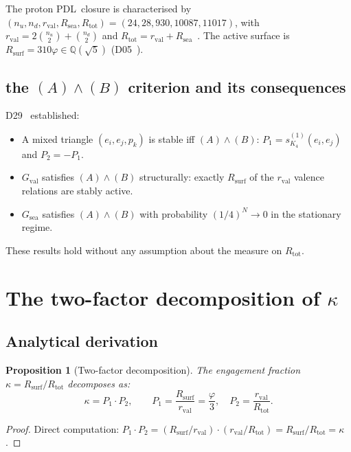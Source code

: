 \documentclass[11pt,a4paper]{article}
\newtheorem{proposition}[theorem]{Proposition}
\theoremstyle{definition}
\newcommand{\PDL}{\textnormal{PDL}}
\newcommand{\rval}{r_{\mathrm{val}}}
\newcommand{\Rsea}{R_{\mathrm{sea}}}
\newcommand{\Rtot}{R_{\mathrm{tot}}}
\newcommand{\Rsurf}{R_{\mathrm{surf}}}
\newcommand{\Gval}{G_{\mathrm{val}}}
\newcommand{\Gsea}{G_{\mathrm{sea}}}
\newcommand{\vp}{\varphi}
\newcommand{\kap}{\kappa}
\begin{document}
The proton \PDL\ closure is characterised by
$(n_u, n_d, \rval, \Rsea, \Rtot) = (24, 28, 930, 10087, 11017)$,
with $\rval = 2\binom{n_u}{2} + \binom{n_d}{2}$ and
$\Rtot = \rval + \Rsea$~\cite{PDL_Main_2026,Combinatorial_Proton_PDL_2026}.
The active surface is $\Rsurf = 310\vp \in \mathbb{Q}(\sqrt{5})$
(D05~\cite{PDL_Main_2026}).

\subsection{the \texorpdfstring{$(A)\wedge(B)$}{(A) wedge (B)} criterion and its consequences}

D29~\cite{PDL_D29_2026} established:
\begin{itemize}
\item A mixed triangle $(e_i, e_j, p_k)$ is stable iff
  $(A)\wedge(B)$: $P_1 = s_{K_4}^{(1)}(e_i,e_j)$ and
  $P_2 = -P_1$.
\item $\Gval$ satisfies $(A)\wedge(B)$ structurally: exactly
  $\Rsurf$ of the $\rval$ valence relations are stably active.
\item $\Gsea$ satisfies $(A)\wedge(B)$ with probability $(1/4)^N \to 0$
  in the stationary regime.
\end{itemize}

These results hold without any assumption about the measure on $\Rtot$.

\section{The two-factor decomposition of \texorpdfstring{$\kap$}{kappa}}
\label{sec:decomp}

\subsection{Analytical derivation}

\begin{proposition}[Two-factor decomposition]
\label{prop:decomp}
The engagement fraction $\kap = \Rsurf/\Rtot$ decomposes as:
\begin{equation}
\kap = P_1 \cdot P_2,
\qquad
P_1 = \frac{\Rsurf}{\rval} = \frac{\vp}{3},
\quad
P_2 = \frac{\rval}{\Rtot}.
\label{eq:decomp}
\end{equation}
\end{proposition}

\begin{proof}
Direct computation:
$P_1 \cdot P_2 = (\Rsurf/\rval)\cdot(\rval/\Rtot) = \Rsurf/\Rtot = \kap$.
\end{proof}
\end{document}
